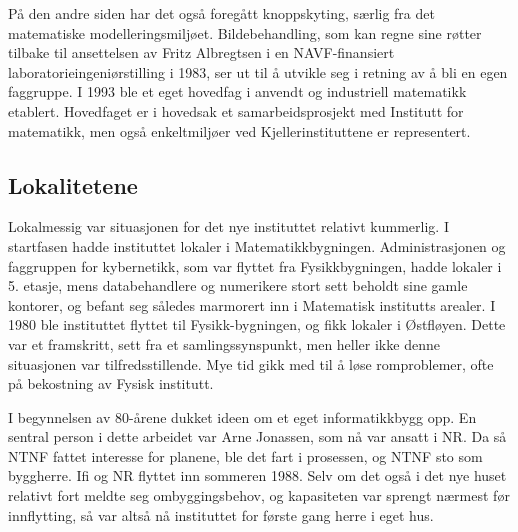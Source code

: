 \documentclass[../main.tex]{subfiles}
\begin{document}
På den andre siden har det også foregått knoppskyting, særlig fra det matematiske modelleringsmiljøet. Bildebehandling, som kan regne sine røtter tilbake til ansettelsen av Fritz Albregtsen i en NAVF-finansiert laboratorieingeniørstilling i 1983, ser ut til å utvikle seg i retning av å bli en egen faggruppe. I 1993 ble et eget hovedfag i anvendt og industriell matematikk etablert. Hovedfaget er i hovedsak et samarbeidsprosjekt med Institutt for matematikk, men også enkeltmiljøer ved Kjellerinstituttene er representert.

\subsection{Lokalitetene}
Lokalmessig var situasjonen for det nye instituttet relativt kummerlig. I startfasen hadde instituttet lokaler i Matematikkbygningen. Administrasjonen og faggruppen for kybernetikk, som var flyttet fra Fysikkbygningen, hadde lokaler i 5. etasje, mens databehandlere og numerikere stort sett beholdt sine gamle kontorer, og befant seg således marmorert inn i Matematisk institutts arealer. I 1980 ble instituttet flyttet til Fysikk-bygningen, og fikk lokaler i Østfløyen. Dette var et framskritt, sett fra et samlingssynspunkt, men heller ikke denne situasjonen var tilfredsstillende. Mye tid gikk med til å løse romproblemer, ofte på bekostning av Fysisk institutt.

I begynnelsen av 80-årene dukket ideen om et eget informatikkbygg opp. En sentral person i dette arbeidet var Arne Jonassen, som nå var ansatt i NR. Da så NTNF fattet interesse for planene, ble det fart i prosessen, og NTNF sto som byggherre. Ifi og NR flyttet inn sommeren 1988. Selv om det også i det nye huset relativt fort meldte seg ombyggingsbehov, og kapasiteten var sprengt nærmest før innflytting, så var altså nå instituttet for første gang herre i eget hus.
\end{document}
